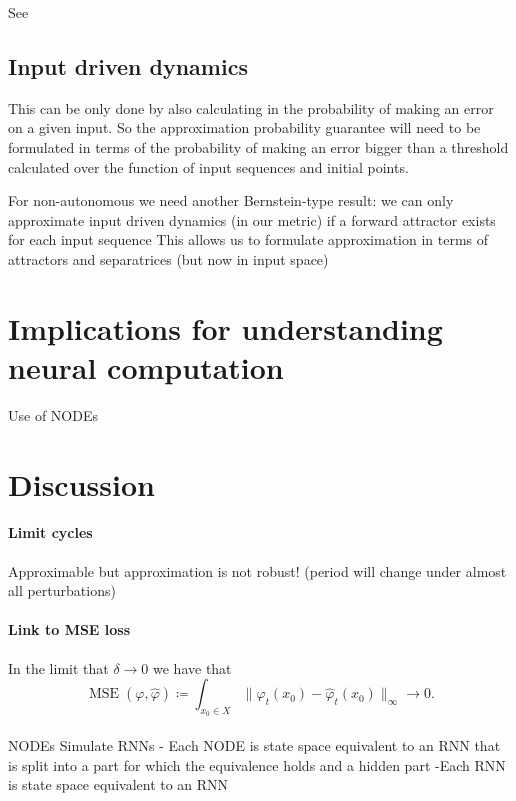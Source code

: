 \documentclass{article}
\theoremstyle{definition}
\theoremstyle{remark}
\begin{document}
See \citep{Sagodi2024a}


\subsection{Input driven dynamics}

This can be only done by also calculating in the probability of making an error on a given input.
So the approximation probability guarantee will need to be formulated in terms of the probability of making an error bigger than a threshold calculated over the function of input sequences and initial points.



For non-autonomous we need another Bernstein-type result:
we can only approximate input driven dynamics (in our metric) if a forward attractor exists for each input sequence 
This allows us to formulate approximation in terms of attractors and separatrices (but now in input space)


\section{Implications for understanding neural computation}

Use of NODEs \citep{kim2021inferring}




\section{Discussion}


\paragraph{Limit cycles}
Approximable but approximation is not robust! (period will change under almost all perturbations)


\paragraph{Link to MSE loss}
In the limit that $\delta\rightarrow 0$ we have that 
\[\operatorname{MSE}(\varphi, \hat{\varphi}) \coloneqq \int_{x_0\in X} \|\varphi_t(x_0) - \hat{\varphi}_t(x_0)\|_\infty \rightarrow 0.\]


\paragraph{}
NODEs Simulate RNNs 
- Each NODE is state space equivalent to an RNN that is split into a part for which the equivalence holds and a hidden part
-Each RNN is state space equivalent to an RNN
\end{document}
